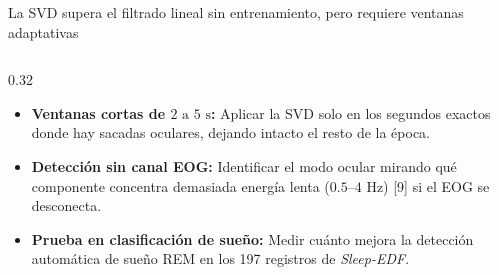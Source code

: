 \documentclass[aspectratio=169,9pt]{beamer}
\begin{document}
\begin{frame}{La SVD supera el filtrado lineal sin entrenamiento, pero requiere ventanas adaptativas}
\begin{columns}[T,onlytextwidth]
    \begin{column}{0.32\textwidth}
      \begin{tcolorbox}[tealcard, title={\scriptsize\bfseries 3. Hoja de Ruta y Trabajo Futuro}, colbacktitle=UDTeal!85!black, coltitle=white, equal height group=dlf]
        \scriptsize
        \begin{itemize}
          \item \textbf{Ventanas cortas de $2\text{ a }5\text{ s}$:} Aplicar la SVD solo en los segundos exactos donde hay sacadas oculares, dejando intacto el resto de la \'epoca.
          \item \textbf{Detecci\'on sin canal EOG:} Identificar el modo ocular mirando qu\'e componente concentra demasiada energ\'ia lenta ($0.5\text{--}4\text{ Hz}$) [9] si el EOG se desconecta.
          \item \textbf{Prueba en clasificaci\'on de sue\~no:} Medir cu\'anto mejora la detecci\'on autom\'atica de sue\~no REM en los 197 registros de \textit{Sleep-EDF}.
        \end{itemize}
      \end{tcolorbox}
    \end{column}
  \end{columns}
\end{frame}
\end{document}
